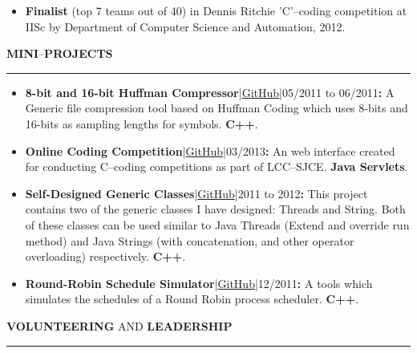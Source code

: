 \documentclass[a4paper, 10pt]{extarticle}
\begin{document}
\begin{large}
\begin{itemize}
{\begin{itemize}
            \item{\textbf{Finalist} (top 7 teams out of 40) in Dennis Ritchie 'C'--coding competition at IISc by Department of Computer Science and Automation, 2012.}
        \end{itemize}
    }    
\end{itemize}
\vspace{.2cm}

\begin{flushleft}
{\LARGE{\textbf{M}}\Large{\textbf{INI}}\large{--}\LARGE{\textbf{P}}\Large{\textbf{ROJECTS}}}
\end{flushleft}
\vspace{-.2cm} \hrule \vspace{-.1cm}

\begin{itemize}
     \setlength\itemsep{-0.01 cm}
    \item{\textbf{8-bit and 16-bit Huffman Compressor}|\href{https://github.com/pradeep0605/HuffmanCompressor}{GitHub}|05/2011 to 06/2011\textbf{{\Large{:}}} A Generic file compression tool based on Huffman Coding which uses 8-bits and 16-bits as sampling lengths for symbols. \textbf{C++}.} 
    
    
    \item{\textbf{Online Coding Competition}|\href{https://github.com/pradeep0605/LCC-SJCE_OnlineCodingWebInterface}{GitHub}|03/2013\textbf{{\Large{:}}} An web interface created for conducting C--coding competitions as part of LCC--SJCE. \textbf{Java Servlets}.} 
    
    \item{\textbf{Self-Designed Generic Classes}|\href{https://github.com/pradeep0605/GenericClasses}{GitHub}|2011 to 2012\textbf{{\Large{:}}} This project contains two of the generic classes I have designed: Threads and String. Both of these classes can be used similar to Java Threads (Extend and override run method) and Java Strings (with concatenation, and other operator overloading) respectively. \textbf{C++}.} 
    
    \item{\textbf{Round-Robin Schedule Simulator}|\href{https://github.com/pradeep0605/RoundRobinScheduleSimulator}{GitHub}|12/2011\textbf{{\Large{:}}} A tools which simulates the schedules of a Round Robin process scheduler. \textbf{C++}.} 
\end{itemize}
\vspace{.2cm}

\begin{flushleft}
{\LARGE{\textbf{V}}\Large{\textbf{OLUNTEERING}} \large{AND} \LARGE{\textbf{L}}\Large{\textbf{EADERSHIP}}}
\end{flushleft}
\vspace{-.2cm} \hrule \vspace{-.1cm}


\end{large}
\end{document}
